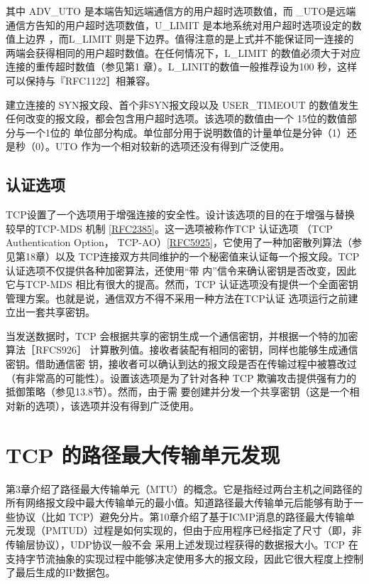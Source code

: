 其中 ADV\_UTO 是本端告知远端通信方的用户超时选项数值，而 \_UTO是远端通信方告知的用户超时选项数值，U\_LIMIT
是本地系统对用户超时选项设定的数值上边界
，而L\_LIMIT 则是下边界。值得注意的是上式并不能保证同一连接的两端会获得相同的用户超时数值。在任何情况下，L\_LIMIT
的数值必须大于对应连接的重传超时数值（参见第1
章）。L\_LINIT的数值一般推荐设为100 秒，这样可以保持与『RFC1122］相兼容。

建立连接的 SYN报文段、首个非SYN报文段以及 USER\_TIMEOUT
的数值发生任何改变的报文段，都会包含用户超时选项。该选项的数值由一个 15位的数值部分与一个1位的
单位部分构成。单位部分用于说明数值的计量单位是分钟（1）还是秒（0）。UTO 作为一个相对较新的选项还没有得到广泛使用。

\subsection{认证选项}
TCP设置了一个选项用于增强连接的安全性。设计该选项的目的在于增强与替换较早的TCP-MDS 机制
\href{https://www.rfc-editor.org/rfc/rfc2385}{[RFC2385]}。这一选项被称作TCP
认证选项 （TCP Authentication Option，
TCP-AO）\href{https://www.rfc-editor.org/rfc/rfc5925}{[RFC5925]}，它使用了一种加密散列算法（参见第18章）以及
TCP连接双方共同维护的一个秘密值来认证每一个报文段。TCP 认证选项不仅提供各种加密算法，还使用“带
内”信令来确认密钥是否改变，因此它与TCP-MDS 相比有很大的提高。然而，TCP
认证选项没有提供一个全面密钥管理方案。也就是说，通信双方不得不采用一种方法在TCP认证
选项运行之前建立出一套共享密钥。

当发送数据时，TCP 会根据共享的密钥生成一个通信密钥，并根据一个特的加密算法［RFCS926］
计算散列值。接收者装配有相同的密钥，同样也能够生成通信密钥。借助通信密
钥，接收者可以确认到达的报文段是否在传输过程中被篡改过（有非常高的可能性）。设置该选项是为了针对各种 TCP
欺骗攻击提供强有力的抵御策略（参见13.8节）。然而，由于需
要创建并分发一个共享密钥（这是一个相对新的选项），该选项并没有得到广泛使用。
\section{TCP 的路径最大传输单元发现}
第3章介绍了路径最大传输单元（MTU）的概念。它是指经过两台主机之间路径的所有网络报文段中最大传输单元的最小值。知道路径最大传输单元后能够有助于一些协议（比如
TCP）避免分片。第10章介绍了基于ICMP消息的路径最大传输单元发现（PMTUD）过程是如何实现的，但由于应用程序已经指定了尺寸（即，非传输层协议），UDP协议一般不会
采用上述发现过程获得的数据报大小。TCP 在支持字节流抽象的实现过程中能够决定使用多大的报文段，因此它很大程度上控制了最后生成的IP数据包。

